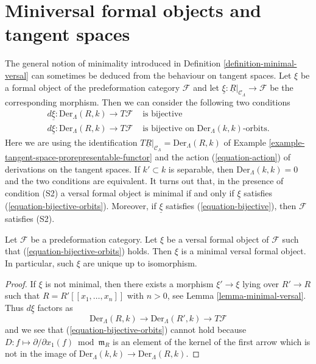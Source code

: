 \section{Miniversal formal objects and tangent spaces}
\label{section-miniversal-objects-existence}

\noindent
The general notion of minimality introduced in
Definition \ref{definition-minimal-versal}
can sometimes be deduced from the behaviour on tangent spaces.
Let $\xi$ be a formal object of the predeformation category
$\mathcal{F}$ and let
$\underline{\xi} : \underline{R}|_{\mathcal{C}_\Lambda} \to \mathcal{F}$
be the corresponding morphism. Then we can consider the following
two conditions
\begin{align}
\label{equation-bijective}
d\underline{\xi} : \text{Der}_\Lambda(R, k) \to T\mathcal{F} &
\text{ is bijective} \\
\label{equation-bijective-orbits}
d\underline{\xi} : \text{Der}_\Lambda(R, k) \to T\mathcal{F} &
\text{ is bijective on }\text{Der}_\Lambda(k, k)\text{-orbits.}
\end{align}
Here we are using the identification
$T\underline{R}|_{\mathcal{C}_\Lambda} = \text{Der}_\Lambda(R, k)$ of
Example \ref{example-tangent-space-prorepresentable-functor}
and the action (\ref{equation-action}) of derivations
on the tangent spaces. If $k' \subset k$ is separable, then
$\text{Der}_\Lambda(k, k) = 0$ and the two conditions are equivalent.
It turns out that, in the presence of condition (S2) a versal formal
object is minimal if and only if $\underline{\xi}$ satisfies
(\ref{equation-bijective-orbits}).
Moreover, if $\underline{\xi}$ satisfies (\ref{equation-bijective}), then
$\mathcal{F}$ satisfies (S2).

\begin{lemma}
\label{lemma-miniversal-object-unique}
Let $\mathcal{F}$ be a predeformation category.
Let $\xi$ be a versal formal object of $\mathcal{F}$ such that
(\ref{equation-bijective-orbits}) holds.
Then $\xi$ is a minimal versal formal object.
In particular, such $\xi$ are unique up to isomorphism.
\end{lemma}

\begin{proof}
If $\xi$ is not minimal, then there exists a morphism
$\xi' \to \xi$ lying over $R' \to R$ such that
$R = R'[[x_1, \ldots, x_n]]$ with $n > 0$, see
Lemma \ref{lemma-minimal-versal}.
Thus $d\underline{\xi}$ factors as
$$
\text{Der}_\Lambda(R, k) \to
\text{Der}_\Lambda(R', k) \to T\mathcal{F}
$$
and we see that (\ref{equation-bijective-orbits}) cannot hold
because $D : f \mapsto \partial/\partial x_1(f) \bmod \mathfrak m_R$
is an element of the kernel of the first arrow which is not in the image of
$\text{Der}_\Lambda(k, k) \to \text{Der}_\Lambda(R, k)$.
\end{proof}

